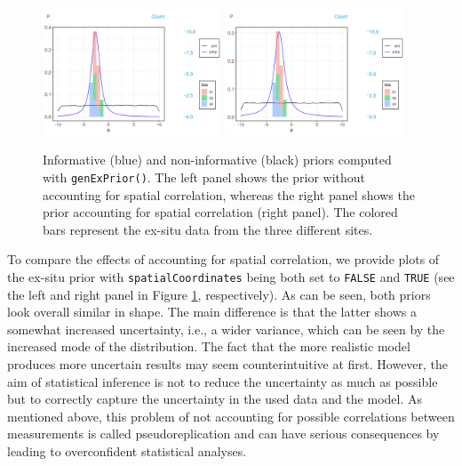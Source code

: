 \begin{figure}
    \centering
    \includegraphics[width=0.475\textwidth]{img/no_spatial_correlation.pdf}
    \includegraphics[width=0.475\textwidth]{img/spatial_correlation.pdf}
    \caption{Informative (blue) and non-informative (black) priors computed with \texttt{genExPrior()}. The left panel shows the prior without accounting for spatial correlation, whereas the right panel shows the prior accounting for spatial correlation (right panel). The colored bars represent the ex-situ data from the three different sites.}
    \label{fig:spatial_priors}
\end{figure}

To compare the effects of accounting for spatial correlation, we provide plots of the ex-situ prior with \texttt{spatialCoordinates} being both set to \texttt{FALSE} and \texttt{TRUE} (see the left and right panel in Figure \ref{fig:spatial_priors}, respectively). 
As can be seen, both priors look overall similar in shape. 
The main difference is that the latter shows a somewhat increased uncertainty, i.e., a wider variance, which can be seen by the increased mode of the distribution. 
The fact that the more realistic model produces more uncertain results may seem counterintuitive at first. 
However, the aim of statistical inference is not to reduce the uncertainty as much as possible but to correctly capture the uncertainty in the used data and the model.
As mentioned above, this problem of not accounting for possible correlations between measurements is called pseudoreplication and can have serious consequences by leading to overconfident statistical analyses.

